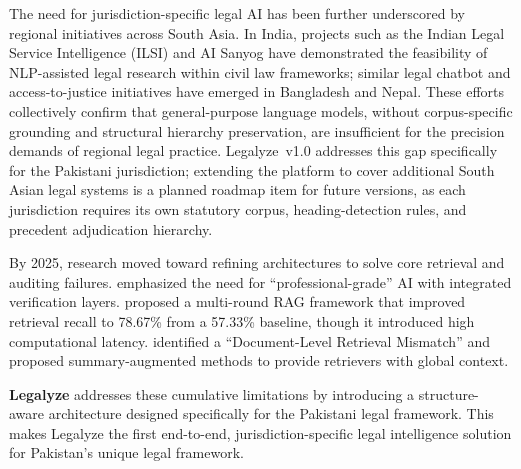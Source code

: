 The need for jurisdiction-specific legal AI has been further underscored by regional
initiatives across South Asia. In India, projects such as the Indian Legal Service
Intelligence (ILSI) and AI Sanyog have demonstrated the feasibility of NLP-assisted
legal research within civil law frameworks; similar legal chatbot and access-to-justice
initiatives have emerged in Bangladesh \cite{r58} and Nepal. These efforts collectively
confirm that general-purpose language models, without corpus-specific grounding and
structural hierarchy preservation, are insufficient for the precision demands of regional
legal practice. Legalyze~v1.0 addresses this gap specifically for the Pakistani
jurisdiction; extending the platform to cover additional South Asian legal systems is a
planned roadmap item for future versions, as each jurisdiction requires its own statutory
corpus, heading-detection rules, and precedent adjudication hierarchy.

By 2025, research moved toward refining architectures to solve core retrieval and
auditing failures. \cite{r132} emphasized the need for ``professional-grade'' AI with
integrated verification layers. \cite{r96} proposed a multi-round RAG framework that
improved retrieval recall to 78.67\% from a 57.33\% baseline, though it introduced high
computational latency. \cite{r45} identified a ``Document-Level Retrieval Mismatch'' and
proposed summary-augmented methods to provide retrievers with global context.

\textbf{Legalyze} addresses these cumulative limitations by introducing a
structure-aware architecture designed specifically for the Pakistani legal framework.  This makes
Legalyze the first end-to-end, jurisdiction-specific legal intelligence solution for
Pakistan's unique legal framework.



\renewcommand{\arraystretch}{1.45}

